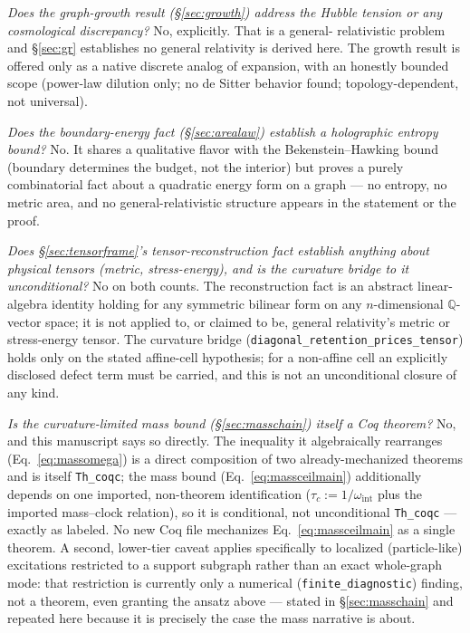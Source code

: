 \documentclass[10pt,twocolumn]{article}
\begin{document}
\noindent\textit{Does the graph-growth result (\S\ref{sec:growth}) address the Hubble
tension or any cosmological discrepancy?} No, explicitly. That is a general-
relativistic problem and \S\ref{sec:gr} establishes no general relativity is derived
here. The growth result is offered only as a native discrete analog of expansion,
with an honestly bounded scope (power-law dilution only; no de Sitter behavior found;
topology-dependent, not universal).

\noindent\textit{Does the boundary-energy fact (\S\ref{sec:arealaw}) establish a
holographic entropy bound?} No. It shares a qualitative flavor with the
Bekenstein--Hawking bound (boundary determines the budget, not the interior) but
proves a purely combinatorial fact about a quadratic energy form on a graph ---
no entropy, no metric area, and no general-relativistic structure appears in the
statement or the proof.

\noindent\textit{Does \S\ref{sec:tensorframe}'s tensor-reconstruction fact
establish anything about physical tensors (metric, stress-energy), and is the
curvature bridge to it unconditional?} No on both counts. The reconstruction
fact is an abstract linear-algebra identity holding for any symmetric bilinear
form on any $n$-dimensional $\mathbb{Q}$-vector space; it is not applied to, or
claimed to be, general relativity's metric or stress-energy tensor. The
curvature bridge (\texttt{diagonal\_retention\_prices\_tensor}) holds only on
the stated affine-cell hypothesis; for a non-affine cell an explicitly disclosed
defect term must be carried, and this is not an unconditional closure of any
kind.

\noindent\textit{Is the curvature-limited mass bound (\S\ref{sec:masschain})
itself a Coq theorem?} No, and this manuscript says so directly. The
inequality it algebraically rearranges (Eq.~\ref{eq:massomega}) is a direct
composition of two already-mechanized theorems and is itself \texttt{Th\_coqc};
the mass bound (Eq.~\ref{eq:massceilmain}) additionally depends on one
imported, non-theorem identification ($\tau_c:=1/\omega_{\mathrm{int}}$ plus
the imported mass--clock relation), so it is conditional, not unconditional
\texttt{Th\_coqc} --- exactly as labeled. No new Coq file mechanizes
Eq.~\ref{eq:massceilmain} as a single theorem. A second, lower-tier caveat
applies specifically to localized (particle-like) excitations restricted to a
support subgraph rather than an exact whole-graph mode: that restriction is
currently only a numerical (\texttt{finite\_diagnostic}) finding, not a
theorem, even granting the ansatz above --- stated in \S\ref{sec:masschain}
and repeated here because it is precisely the case the mass narrative is
about.
\end{document}
